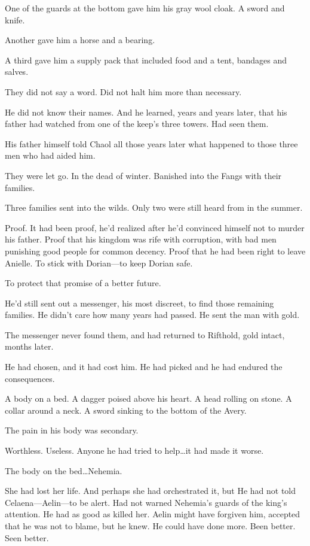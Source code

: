 One of the guards at the bottom gave him his gray wool cloak.
A sword and knife.

Another gave him a horse and a bearing.

A third gave him a supply pack that included food and a tent, bandages and salves.

They did not say a word.
Did not halt him more than necessary.

He did not know their names.
And he learned, years and years later, that his father had watched from one of the keep's three towers.
Had seen them.

His father himself told Chaol all those years later what happened to those three men who had aided him.

They were let go.
In the dead of winter.
Banished into the Fangs with their families.

Three families sent into the wilds.
Only two were still heard from in the summer.

Proof.
It had been proof, he'd realized after he'd convinced himself not to murder his father.
Proof that his kingdom was rife with corruption, with bad men punishing good people for common decency.
Proof that he had been right to leave Anielle.
To stick with Dorian---to keep Dorian safe.

To protect that promise of a better future.

He'd still sent out a messenger, his most discreet, to find those remaining families.
He didn't care how many years had passed.
He sent the man with gold.

The messenger never found them, and had returned to Rifthold, gold intact, months later.

He had chosen, and it had cost him.
He had picked and he had endured the consequences.

A body on a bed.
A dagger poised above his heart.
A head rolling on stone.
A collar around a neck.
A sword sinking to the bottom of the Avery.

The pain in his body was secondary.

Worthless.
Useless.
Anyone he had tried to help\ldots it had made it worse.

The body on the bed\ldots Nehemia.

She had lost her life.
And perhaps she had orchestrated it, but 
He had not told Celaena---Aelin---to be alert.
Had not warned Nehemia's guards of the king's attention.
He had as good as killed her.
Aelin might have forgiven him, accepted that he was not to blame, but he knew.
He could have done more.
Been better.
Seen better.

